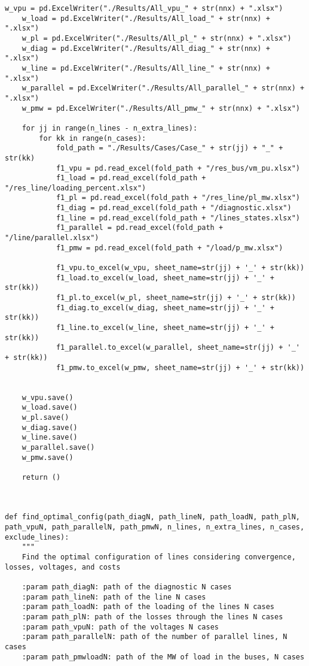 \begin{lstlisting}[caption={Main code in Python with the Pandapower library}]
    w_vpu = pd.ExcelWriter("./Results/All_vpu_" + str(nnx) + ".xlsx")
    w_load = pd.ExcelWriter("./Results/All_load_" + str(nnx) + ".xlsx")
    w_pl = pd.ExcelWriter("./Results/All_pl_" + str(nnx) + ".xlsx")
    w_diag = pd.ExcelWriter("./Results/All_diag_" + str(nnx) + ".xlsx")
    w_line = pd.ExcelWriter("./Results/All_line_" + str(nnx) + ".xlsx")
    w_parallel = pd.ExcelWriter("./Results/All_parallel_" + str(nnx) + ".xlsx")
    w_pmw = pd.ExcelWriter("./Results/All_pmw_" + str(nnx) + ".xlsx")

    for jj in range(n_lines - n_extra_lines):
        for kk in range(n_cases):
            fold_path = "./Results/Cases/Case_" + str(jj) + "_" + str(kk)
            f1_vpu = pd.read_excel(fold_path + "/res_bus/vm_pu.xlsx")
            f1_load = pd.read_excel(fold_path + "/res_line/loading_percent.xlsx")
            f1_pl = pd.read_excel(fold_path + "/res_line/pl_mw.xlsx")
            f1_diag = pd.read_excel(fold_path + "/diagnostic.xlsx")
            f1_line = pd.read_excel(fold_path + "/lines_states.xlsx")
            f1_parallel = pd.read_excel(fold_path + "/line/parallel.xlsx")
            f1_pmw = pd.read_excel(fold_path + "/load/p_mw.xlsx")

            f1_vpu.to_excel(w_vpu, sheet_name=str(jj) + '_' + str(kk))
            f1_load.to_excel(w_load, sheet_name=str(jj) + '_' + str(kk))
            f1_pl.to_excel(w_pl, sheet_name=str(jj) + '_' + str(kk))
            f1_diag.to_excel(w_diag, sheet_name=str(jj) + '_' + str(kk))
            f1_line.to_excel(w_line, sheet_name=str(jj) + '_' + str(kk))
            f1_parallel.to_excel(w_parallel, sheet_name=str(jj) + '_' + str(kk))
            f1_pmw.to_excel(w_pmw, sheet_name=str(jj) + '_' + str(kk))


    w_vpu.save()
    w_load.save()
    w_pl.save()
    w_diag.save()
    w_line.save()
    w_parallel.save()
    w_pmw.save()

    return ()



def find_optimal_config(path_diagN, path_lineN, path_loadN, path_plN, path_vpuN, path_parallelN, path_pmwN, n_lines, n_extra_lines, n_cases, exclude_lines):
    """
    Find the optimal configuration of lines considering convergence, losses, voltages, and costs

    :param path_diagN: path of the diagnostic N cases
    :param path_lineN: path of the line N cases
    :param path_loadN: path of the loading of the lines N cases
    :param path_plN: path of the losses through the lines N cases
    :param path_vpuN: path of the voltages N cases
    :param path_parallelN: path of the number of parallel lines, N cases
    :param path_pmwloadN: path of the MW of load in the buses, N cases


\end{lstlisting}
